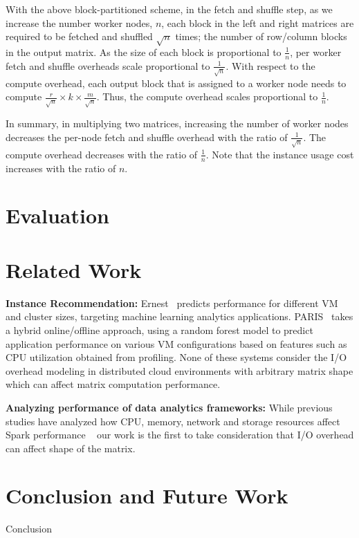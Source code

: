 \documentclass[10pt, conference, compsocconf]{IEEEtran}
\begin{document}
With the above block-partitioned scheme, in the fetch and shuffle step, as we increase the number worker nodes, $n$, each block in the left and right matrices are required to be fetched and shuffled $\sqrt{n}$ times; the number of row/column blocks in the output matrix. As the size of each block is proportional to $\frac{1}{n}$, per worker fetch and shuffle overheads scale proportional to $\frac{1}{\sqrt{n}}$. With respect to the compute overhead, each output block that is assigned to a worker node needs to compute $\frac{r}{\sqrt{n}}\times k \times \frac{m}{\sqrt{n}}$. Thus, the compute overhead scales proportional to $\frac{1}{n}$.

In summary, in multiplying two matrices, increasing the number of worker nodes decreases the per-node fetch and shuffle overhead with the ratio of $\frac{1}{\sqrt{n}}$. The compute overhead decreases with the ratio of $\frac{1}{n}$. Note that the instance usage cost increases with the ratio of $n$.


\section{Evaluation}{\label{eval}}

\section{Related Work}\label{sec:relatedwork}
\textbf{Instance Recommendation:} Ernest~\cite{venkataraman2016ernest} predicts performance for different VM and cluster sizes, targeting machine learning analytics applications. PARIS~\cite{Yadwadkar:2017:SBV:3127479.3131614} takes a hybrid online/offline approach, using a random forest model to predict application performance on various VM configurations based on features such as CPU utilization obtained from profiling. None of these systems consider the I/O overhead modeling in distributed cloud environments with arbitrary matrix shape which can affect matrix computation performance. 

\textbf{Analyzing performance of data analytics frameworks:} While previous studies have analyzed how CPU, memory, network and storage resources affect Spark performance ~\cite{196352,li2014tachyon,ousterhout2015making} our work is the first to take consideration that I/O overhead can affect shape of the matrix. 


\section{Conclusion and Future Work}
Conclusion~\cite{tr-spark}




\end{document}
